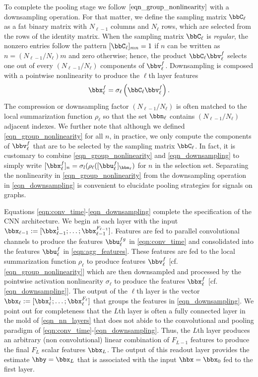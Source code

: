 To complete the pooling stage we follow $\eqref{eqn_group_nonlinearity}$ with a downsampling operation. For that matter, we define the sampling matrix $\bbC_{\ell}$ as a fat binary matrix with $N_{\ell-1}$ columns and $N_{\ell}$ rows, which are selected from the rows of the identity matrix. When the sampling matrix $\bbC_{\ell}$ is \textit{regular}, the nonzero entries follow the pattern $[\bbC_{\ell}]_{mn}=1$ if $n$ can be written as $n=(N_{\ell-1}/N_{\ell})m$ and zero otherwise; hence, the product $\bbC_{\ell}\bbv^{f}_{\ell}$ selects one out of every $(N_{\ell-1}/N_{\ell})$ components of $\bbv^{f}_{\ell}$. Downsampling is composed with a pointwise nonlinearity to produce the $\ell$th layer features
% 
\begin{equation}\label{eqn_downsampling}
   \bbx^{f}_{\ell} =  \sigma_\ell \left(\bbC_{\ell}\bbv^{f}_{\ell} \right).
\end{equation}
%
The compression or downsampling factor $(N_{\ell-1}/N_{\ell})$ is often matched to the local summarization function $\rho_{\ell}$ so that the set $\bbn_\ell$ contains $(N_{\ell-1}/N_{\ell})$ adjacent indexes. We further note that although we defined \eqref{eqn_group_nonlinearity} for all $n$, in practice, we only compute the components of $\bbv^{f}_{\ell}$ that are to be selected by the sampling matrix $\bbC_\ell$. In fact, it is customary to combine \eqref{eqn_group_nonlinearity} and \eqref{eqn_downsampling} to simply write $[\bbx^{f}_{\ell}]_n = \sigma_l (\rho_{\ell}( [\bbu_{\ell}^f]_{\bbn_\ell})$ for $n$ in the selection set. Separating the nonlinearity in \eqref{eqn_group_nonlinearity} from the downsampling operation in \eqref{eqn_downsampling} is convenient to elucidate pooling strategies for signals on graphs.

Equations \eqref{eqn:conv_time}-\eqref{eqn_downsampling} complete the specification of the CNN architecture. We begin at each layer with the input $\bbx_{\ell-1} := [\bbx^{1}_{\ell-1}; \ldots; \bbx^{F_{\ell-1}}_{\ell-1}]$. Features are fed to parallel convolutional channels to produce the features  $\bbu_{\ell}^{fg}$ in \eqref{eqn:conv_time} and consolidated into the features $\bbu_{\ell}^{f}$ in \eqref{eqn:agg_features}. These features are fed to the local summarization function $\rho_{\ell}$ to produce features $\bbv^{f}_{\ell}$ [cf. \eqref{eqn_group_nonlinearity}] which are then downsampled and processed by the pointwise activation nonlinearity $\sigma_{\ell}$ to produce the features $\bbx^{f}_{\ell}$ [cf. \eqref{eqn_downsampling}]. The output of the $\ell$th layer is the vector $\bbx_\ell := [\bbx^{1}_{\ell}; \ldots; \bbx^{F_\ell}_{\ell}]$ that groups the features in \eqref{eqn_downsampling}. We point out for completeness that the $L$th layer is often a fully connected layer in the mold of \eqref{eqn_nn_layers} that does not abide to the convolutional and pooling paradigm of \eqref{eqn:conv_time}-\eqref{eqn_downsampling}. Thus, the $L$th layer produces an arbitrary (non convolutional) linear combination of $F_{L-1}$ features to produce the final $F_{L}$ scalar features $\bbx_L$. The output of this readout layer provides the estimate $\hby = \bbx_L$ that is associated with the input $\hbx=\bbx_0$ fed to the first layer.


